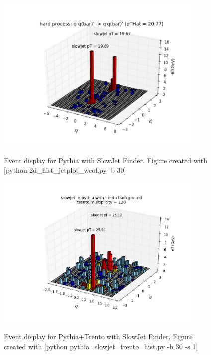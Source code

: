 \documentclass[11pt]{article}
\begin{document}
\begin{figure}[h]
\begin{center}
\includegraphics[width=0.9\textwidth]{2d_hist_jetplot_wcol.png}
\label{fig_label}
\caption{Event display for Pythia with SlowJet Finder.  Figure created with [python 2d\_hist\_jetplot\_wcol.py -b 30]}
\end{center}
\end{figure}

\begin{figure}[h]
\begin{center}
\includegraphics[width=0.9\textwidth]{pythia_slowjet_trento_hist1.png}
\label{fig_label}
\caption{Event display for Pythia+Trento with SlowJet Finder.  Figure created with [python pythia\_slowjet\_trento\_hist.py -b 30 -s 1]}
\end{center}
\end{figure}
\end{document}
